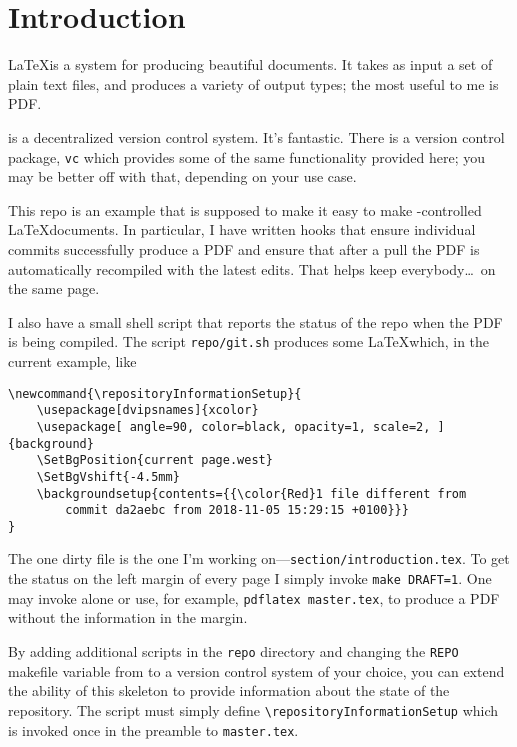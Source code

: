\section{Introduction}

\LaTeX is a system for producing beautiful documents.
It takes as input a set of plain text files, and produces a variety of output types; the most useful to me is PDF.

\git is a decentralized version control system.
It's fantastic.
There is a version control package, \texttt{vc}\cite{vc} which provides some of the same functionality provided here; you may be better off with that, depending on your use case.

This repo\cite{latex-base} is an example that is supposed to make it easy to make \git-controlled \LaTeX documents.
In particular, I have written \git hooks that ensure individual commits successfully produce a PDF and ensure that after a pull the PDF is automatically recompiled with the latest edits.
That helps keep everybody\ldots\ on the same page.

I also have a small shell script that reports the status of the repo when the PDF is being compiled.
The script \texttt{repo/git.sh} produces some \LaTeX which, in the current example, like
\begin{verbatim}
\newcommand{\repositoryInformationSetup}{
    \usepackage[dvipsnames]{xcolor}
    \usepackage[ angle=90, color=black, opacity=1, scale=2, ]{background}
    \SetBgPosition{current page.west}
    \SetBgVshift{-4.5mm}
    \backgroundsetup{contents={{\color{Red}1 file different from 
        commit da2aebc from 2018-11-05 15:29:15 +0100}}}
}\end{verbatim}
The one dirty file is the one I'm working on---\texttt{section/introduction.tex}.
To get the \git status on the left margin of every page I simply invoke \texttt{make DRAFT=1}.
One may invoke \make alone or use, for example, \texttt{pdflatex master.tex}, to produce a PDF without the \git information in the margin.

By adding additional scripts in the \texttt{repo} directory and changing the \texttt{REPO} makefile variable from \git to a version control system of your choice, you can extend the ability of this skeleton to provide information about the state of the repository.
The script must simply define \texttt{{\textbackslash}repositoryInformationSetup} which is invoked once in the preamble to \texttt{master.tex}.
